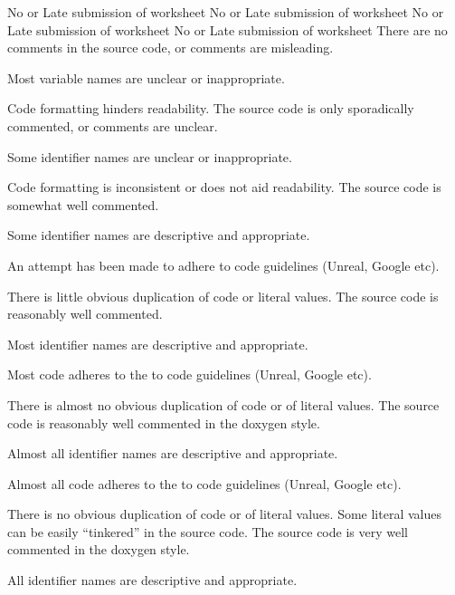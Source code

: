 \documentclass{../../fal_assignment}
\begin{document}
\begin{markingrubric}
		\grade\fail No or Late submission of worksheet
		\grade\fail No or Late submission of worksheet
		\grade\fail No or Late submission of worksheet
		\grade\fail No or Late submission of worksheet
\grade\fail There are no comments in the source code, or comments are misleading.
\par Most variable names are unclear or inappropriate.
\par Code formatting hinders readability.
\grade The source code is only sporadically commented, or comments are unclear.
\par Some identifier names are unclear or inappropriate.
\par Code formatting is inconsistent or does not aid readability.
\grade The source code is somewhat well commented.
\par Some identifier names are descriptive and appropriate.
\par An attempt has been made to adhere to code guidelines (Unreal, Google etc).
\par There is little obvious duplication of code or literal values.           
\grade The source code is reasonably well commented.
\par Most identifier names are descriptive and appropriate.
\par Most code adheres to the to code guidelines (Unreal, Google etc).
\par There is almost no obvious duplication of code or of literal values.   
\grade The source code is reasonably well commented in the doxygen style.
\par Almost all identifier names are descriptive and appropriate.
\par Almost all code adheres to the to code guidelines (Unreal, Google etc).
\par There is no obvious duplication of code or of literal values. Some literal values can be easily ``tinkered'' in the source code. 
\grade The source code is very well commented in the doxygen style.
\par All identifier names are descriptive and appropriate.

\end{markingrubric}
\end{document}

